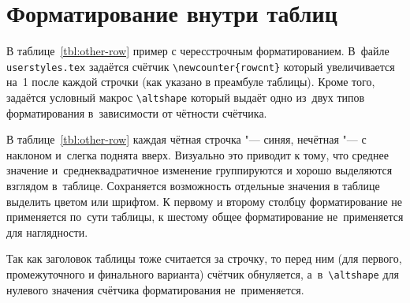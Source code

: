\section{Форматирование внутри таблиц} \label{AppendixB3}

В таблице~\ref{tbl:other-row} пример с чересстрочным
форматированием. В~файле \verb+userstyles.tex+  задаётся счётчик
\verb+\newcounter{rowcnt}+ который увеличивается на~1 после каждой
строчки (как указано в преамбуле таблицы). Кроме того, задаётся
условный макрос \verb+\altshape+ который выдаёт одно
из~двух типов форматирования в~зависимости от чётности счётчика.

В таблице~\ref{tbl:other-row} каждая чётная строчка "--- синяя,
нечётная "--- с наклоном и~слегка поднята вверх. Визуально это приводит
к тому, что среднее значение и~среднеквадратичное изменение
группируются и хорошо выделяются взглядом в~таблице. Сохраняется
возможность отдельные значения в таблице выделить цветом или
шрифтом. К первому и второму столбцу форматирование не применяется
по~сути таблицы, к шестому общее форматирование не~применяется для
наглядности.

Так как заголовок таблицы тоже считается за строчку, то перед ним (для
первого, промежуточного и финального варианта) счётчик обнуляется,
а~в~\verb+\altshape+ для нулевого значения счётчика форматирования
не~применяется.

